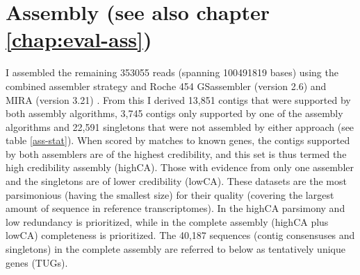 \afterpage{\clearpage}

\section{Assembly (see also chapter \ref{chap:eval-ass})}


I assembled the remaining 353055 reads (spanning 100491819 bases)
using the combined assembler strategy \cite{pmid20950480} and Roche
454 GSassembler (version 2.6) and MIRA (version 3.21)
\cite{miraEST}. From this I derived 13,851 contigs that were supported
by both assembly algorithms, 3,745 contigs only supported by one of
the assembly algorithms and 22,591 singletons that were not assembled
by either approach (see table \ref{ass-stat}). When scored by matches
to known genes, the contigs supported by both assemblers are of the
highest credibility, and this set is thus termed the high credibility
assembly (highCA). Those with evidence from only one assembler and the
singletons are of lower credibility (lowCA). These datasets are the
most parsimonious (having the smallest size) for their quality
(covering the largest amount of sequence in reference
transcriptomes). In the highCA parsimony and low redundancy is
prioritized, while in the complete assembly (highCA plus lowCA)
completeness is prioritized. The 40,187 sequences (contig consensuses
and singletons) in the complete assembly are referred to below as
tentatively unique genes (TUGs).

